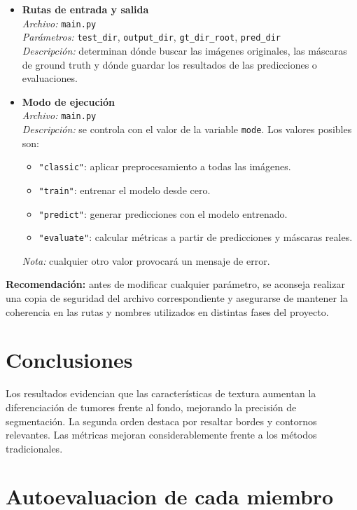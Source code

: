 \documentclass[12pt]{article}
\begin{document}
\begin{itemize}
    \item \textbf{Rutas de entrada y salida} \\
    \textit{Archivo:} \texttt{main.py} \\
    \textit{Parámetros:} \texttt{test\_dir}, \texttt{output\_dir}, \texttt{gt\_dir\_root}, \texttt{pred\_dir} \\
    \textit{Descripción:} determinan dónde buscar las imágenes originales, las máscaras de ground truth y dónde guardar los resultados de las predicciones o evaluaciones.

    \item \textbf{Modo de ejecución} \\
    \textit{Archivo:} \texttt{main.py} \\
    \textit{Descripción:} se controla con el valor de la variable \texttt{mode}. Los valores posibles son:
    \begin{itemize}
        \item \texttt{"classic"}: aplicar preprocesamiento a todas las imágenes.
        \item \texttt{"train"}: entrenar el modelo desde cero.
        \item \texttt{"predict"}: generar predicciones con el modelo entrenado.
        \item \texttt{"evaluate"}: calcular métricas a partir de predicciones y máscaras reales.
    \end{itemize}
    \textit{Nota:} cualquier otro valor provocará un mensaje de error.
\end{itemize}

\textbf{Recomendación:} antes de modificar cualquier parámetro, se aconseja realizar una copia de seguridad del archivo correspondiente y asegurarse de mantener la coherencia en las rutas y nombres utilizados en distintas fases del proyecto.


\section{Conclusiones}
Los resultados evidencian que las características de textura aumentan la diferenciación de tumores frente al fondo, mejorando la precisión de segmentación. La segunda orden destaca por resaltar bordes y contornos relevantes. Las métricas mejoran considerablemente frente a los métodos tradicionales.

\section{Autoevaluacion de cada miembro}
\end{document}
